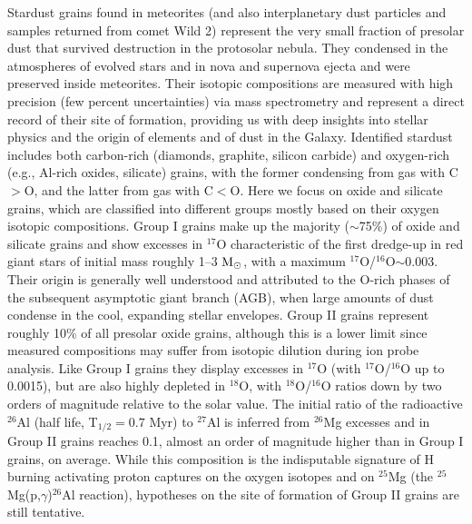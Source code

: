 \documentclass{nature}
\newcommand{\iso}[2]{\hbox{${}^{#1}${#2}}}
\newcommand{\msun}{\ensuremath{{\rm M}_{\odot}}}
\begin{document}
Stardust grains found in meteorites (and also interplanetary dust particles and
samples returned from comet Wild 2) represent the very small fraction 
of presolar dust that 
survived destruction in the protosolar nebula. They condensed in the atmospheres 
of evolved stars and in nova and supernova ejecta and were preserved inside 
meteorites\cite{zinner14}. Their isotopic compositions are measured with high 
precision (few percent uncertainties) via mass spectrometry and represent 
a direct record of their site of formation, providing us with deep  
insights into stellar physics and the origin of elements and of dust in the Galaxy. 
Identified stardust includes both 
carbon-rich (diamonds, graphite, 
silicon carbide) and oxygen-rich (e.g., Al-rich oxides, silicate) grains, with 
the former condensing from gas with C$>$O, and the latter from gas with C$<$O. 
Here we focus on oxide and silicate grains, which are  
classified into different groups 
mostly based on their oxygen isotopic compositions\cite{nittler97}.
Group I grains make up the majority ($\sim$75\%) 
of oxide and silicate grains and show excesses 
in \iso{17}O 
characteristic of the first dredge-up in red giant stars of initial mass roughly 1--3 
\msun, with a maximum \iso{17}O/\iso{16}O$\sim$0.003. 
Their origin is generally well understood and 
attributed to the O-rich phases of the subsequent
asymptotic giant branch (AGB), when large amounts of dust condense in the 
cool, expanding stellar envelopes\cite{gail09}. Group II grains represent roughly 10\% 
of all presolar oxide grains, although this is a lower limit since 
measured compositions may suffer
from isotopic dilution during ion probe analysis.
Like Group I grains they 
display excesses in \iso{17}O (with \iso{17}O/\iso{16}O up to 0.0015), 
but are also highly depleted in \iso{18}O, 
with \iso{18}O/\iso{16}O ratios 
down by two orders of magnitude relative to the solar value.
The initial ratio of the radioactive \iso{26}Al (half life, T$_{1/2} = 0.7$ Myr) to 
\iso{27}Al is inferred from \iso{26}Mg excesses and in Group II grains 
reaches 0.1, almost an order 
of magnitude higher than in Group I grains, on average. 
While this composition is the 
indisputable signature of H burning activating proton captures 
on the oxygen isotopes and on \iso{25}Mg
(the \iso{25}Mg(p,$\gamma$)\iso{26}Al reaction), hypotheses on the 
site of formation of Group II grains are still tentative.
\end{document}

